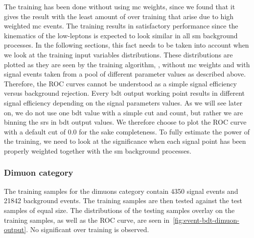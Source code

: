 The training has been done without using \gls{mc} weights, since we found that it gives the result with the least amount of over training that arise due to high weighted \gls{mc} events. The training results in satisfactory performance since the kinematics of the low-\pt leptons is expected to look similar in all \gls{sm} background processes. In the following sections, this fact needs to be taken into account when we look at the training input variables distributions. These distributions are plotted as they are seen by the training algorithm, \ie, without \gls{mc} weights and with signal events taken from a pool of different parameter values as described above. Therefore, the ROC curves cannot be understood as a simple signal efficiency versus background rejection. Every \gls{bdt} output working point results in different signal efficiency depending on the signal parameters values. As we will see later on, we do not use one \gls{bdt} value with a simple cut and count, but rather we are binning the \glspl{sr} in \gls{bdt} output values. We therefore choose to plot the ROC curve with a default cut of 0.0 for the sake completeness. To fully estimate the power of the training, we need to look at the significance when each signal point has been properly weighted together with the \gls{sm} background processes. 

\subsubsection{Dimuon category}

The training samples for the dimuons category contain 4350 signal events and 21842 background events. The training samples are then tested against the test samples of equal size. The distributions of the testing samples overlay on the training samples, as well as the ROC curve, are seen in~\ref{fig:event-bdt-dimuon-output}. No significant over training is observed. 

